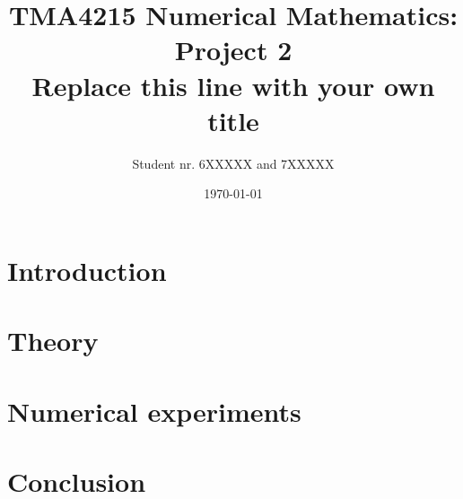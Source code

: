 \documentclass[10pt]{article}
\title{TMA4215 Numerical Mathematics: Project 2 \\ Replace this line with your own title}
\author{Student nr. 6XXXXX and 7XXXXX} %
\date{\today}
\begin{document}
\maketitle
\begin{abstract}

\end{abstract}

\section{Introduction} 

\section{Theory}

\section{Numerical experiments}

\section{Conclusion}
\cite{Plass:1983}


\end{document}
